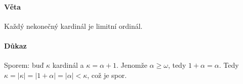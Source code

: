 \documentclass[a4paper,12pt,titlepage]{article}
\begin{document}
\begin{enumerate}
\paragraph{Věta}
Každý nekonečný kardinál je limitní ordinál.
\paragraph{Důkaz}
Sporem: buď $\kappa$ kardinál a $\kappa = \alpha + 1$. Jenomže $\alpha \ge
\omega$, tedy $1 + \alpha = \alpha$. Tedy $\kappa = |\kappa| = |1+\alpha| =
|\alpha| < \kappa$, což je spor.






\end{enumerate}
\end{document}
